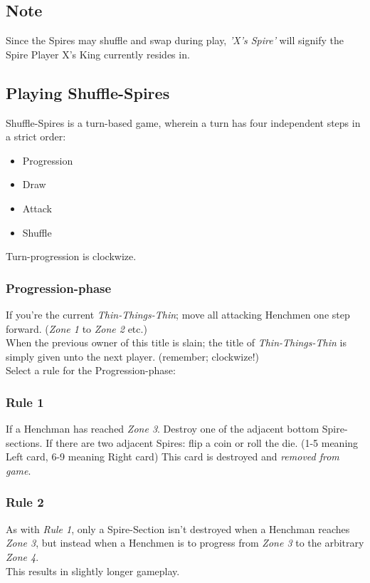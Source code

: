 \documentclass[11pt,twocolumn]{article}
\begin{document}
\subsection{Note}
Since the Spires may shuffle and swap during play, \textit{'X's Spire'} will signify the Spire Player X's King currently resides in.

\subsection{Playing \textbf{Shuffle-Spires}}
Shuffle-Spires is a turn-based game, wherein a turn has four independent steps in a strict order:
\begin{itemize}
\renewcommand{\labelitemi}{$\bullet$}
\item  Progression
\item Draw
\item Attack
\item Shuffle
\end{itemize}
Turn-progression is clockwize.

\subsubsection{Progression-phase}
If you’re the current \textit{Thin-Things-Thin}; move all attacking Henchmen one step forward. (\textit{Zone 1} to \textit{Zone 2} etc.) \\
When the previous owner of this title is slain; the title of \textit{Thin-Things-Thin} is simply given unto the next player. (remember; clockwize!) \\
Select a rule for the Progression-phase:
\subsubsection{Rule 1}
If a Henchman has reached \textit{Zone 3}. Destroy one of the adjacent bottom Spire-sections. If there are two adjacent Spires: flip a coin or roll the die. (1-5 meaning Left card, 6-9 meaning Right card) This card is destroyed and \textit{removed from game}.
\subsubsection{Rule 2}
As with \textit{Rule 1}, only a Spire-Section isn’t destroyed when a Henchman reaches \textit{Zone 3}, but instead when a Henchmen is to progress from \textit{Zone 3} to the arbitrary \textit{Zone 4}. \\
This results in slightly longer gameplay. \\
\end{document}
